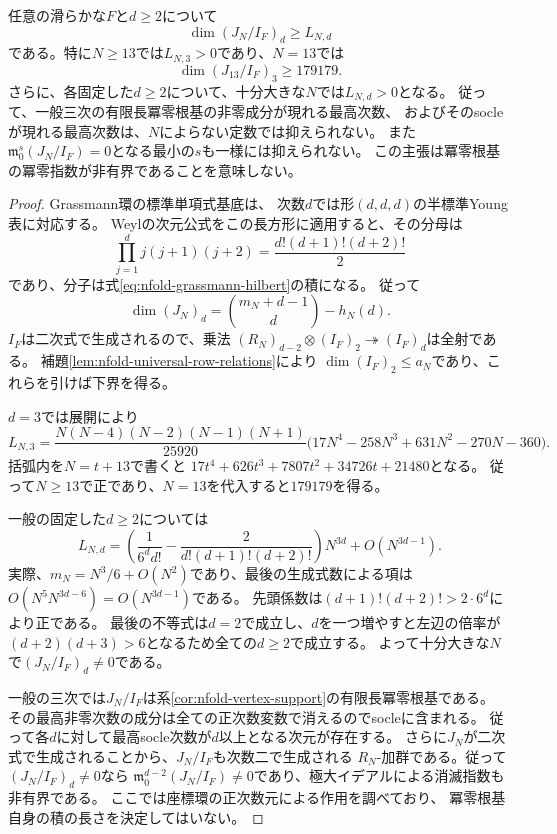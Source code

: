 \begin{proposition}[高次数の差と次数幅の非一様性]
\label{prop:nfold-higher-nilradical}
任意の滑らかな$F$と$d\ge2$について
\[
 \dim(J_N/I_F)_d\ge L_{N,d}
\]
である。特に$N\ge13$では$L_{N,3}>0$であり、$N=13$では
\[
 \dim(J_{13}/I_F)_3\ge179179.
\]
さらに、各固定した$d\ge2$について、十分大きな$N$では$L_{N,d}>0$となる。
従って、一般三次の有限長冪零根基の非零成分が現れる最高次数、
およびそのsocleが現れる最高次数は、$N$によらない定数では抑えられない。
また$\mathfrak m_0^s(J_N/I_F)=0$となる最小の$s$も一様には抑えられない。
この主張は冪零根基の冪零指数が非有界であることを意味しない。
\end{proposition}
\begin{proof}
Grassmann環の標準単項式基底\cite[\S2.4, Theorem~2.3]{BCMStandardMonomial}は、
次数$d$では形$(d,d,d)$の半標準Young表に対応する。
Weylの次元公式をこの長方形に適用すると、その分母は
\[
 \prod_{j=1}^d j(j+1)(j+2)
 =\frac{d!(d+1)!(d+2)!}{2}
\]
であり、分子は式\eqref{eq:nfold-grassmann-hilbert}の積になる。
従って
\[
 \dim(J_N)_d=\binom{m_N+d-1}{d}-h_N(d).
\]
$I_F$は二次式で生成されるので、乗法
$(R_N)_{d-2}\otimes(I_F)_2\twoheadrightarrow(I_F)_d$は全射である。
補題\ref{lem:nfold-universal-row-relations}により
$\dim(I_F)_2\le a_N$であり、これらを引けば下界を得る。

$d=3$では展開により
\[
 L_{N,3}=
 \frac{N(N-4)(N-2)(N-1)(N+1)}{25920}
 \bigl(17N^4-258N^3+631N^2-270N-360\bigr).
\]
括弧内を$N=t+13$で書くと
$17t^4+626t^3+7807t^2+34726t+21480$となる。
従って$N\ge13$で正であり、$N=13$を代入すると$179179$を得る。

一般の固定した$d\ge2$については
\[
 L_{N,d}=
 \left(\frac1{6^dd!}-\frac2{d!(d+1)!(d+2)!}\right)N^{3d}
       +O(N^{3d-1}).
\]
実際、$m_N=N^3/6+O(N^2)$であり、最後の生成式数による項は
$O(N^5N^{3d-6})=O(N^{3d-1})$である。
先頭係数は$(d+1)!(d+2)!>2\cdot6^d$により正である。
最後の不等式は$d=2$で成立し、$d$を一つ増やすと左辺の倍率が
$(d+2)(d+3)>6$となるため全ての$d\ge2$で成立する。
よって十分大きな$N$で$(J_N/I_F)_d\ne0$である。

一般の三次では$J_N/I_F$は系\ref{cor:nfold-vertex-support}の有限長冪零根基である。
その最高非零次数の成分は全ての正次数変数で消えるのでsocleに含まれる。
従って各$d$に対して最高socle次数が$d$以上となる次元が存在する。
さらに$J_N$が二次式で生成されることから、$J_N/I_F$も次数二で生成される
$R_N$-加群である。従って$(J_N/I_F)_d\ne0$なら
$\mathfrak m_0^{d-2}(J_N/I_F)\ne0$であり、極大イデアルによる消滅指数も非有界である。
ここでは座標環の正次数元による作用を調べており、
冪零根基自身の積の長さを決定してはいない。
\end{proof}

